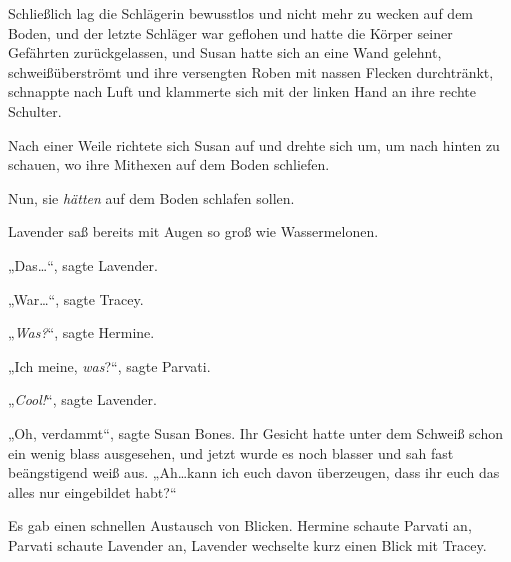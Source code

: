 Schließlich lag die Schlägerin bewusstlos und nicht mehr zu wecken auf dem Boden, und der letzte Schläger war geflohen und hatte die Körper seiner Gefährten zurückgelassen, und Susan hatte sich an eine Wand gelehnt, schweißüberströmt und ihre versengten Roben mit nassen Flecken durchtränkt, schnappte nach Luft und klammerte sich mit der linken Hand an ihre rechte Schulter.

Nach einer Weile richtete sich Susan auf und drehte sich um, um nach hinten zu schauen, wo ihre Mithexen auf dem Boden schliefen.

Nun, sie \emph{hätten} auf dem Boden schlafen sollen.

Lavender saß bereits mit Augen so groß wie Wassermelonen.

„Das…“, sagte Lavender.

„War…“, sagte Tracey.

„\emph{Was?}“, sagte Hermine.

„Ich meine, \emph{was}?“, sagte Parvati.

„\emph{Cool!}“, sagte Lavender.

„Oh, verdammt“, sagte Susan Bones. Ihr Gesicht hatte unter dem Schweiß schon ein wenig blass ausgesehen, und jetzt wurde es noch blasser und sah fast beängstigend weiß aus. „Ah…kann ich euch davon überzeugen, dass ihr euch das alles nur eingebildet habt?“

Es gab einen schnellen Austausch von Blicken. Hermine schaute Parvati an, Parvati schaute Lavender an, Lavender wechselte kurz einen Blick mit Tracey.

